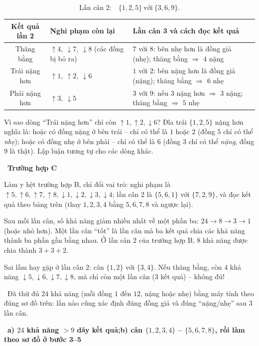 \documentclass[11pt]{article}
\providecommand{\AnsWord}{Đáp số}
\newcommand{\ans}[1]{\par\smallskip{\bfseries\color{tmGreen!88!black}\AnsWord:}\ {\bfseries\color{AnsRed}#1}\par}
\newcommand{\step}[2]{\par\smallskip\noindent{\bfseries\color{tmBlue!85!black}\StepWord~#1.}\ {\bfseries #2}\par\nopagebreak}
\newcommand{\verify}[1]{\par\smallskip\noindent{\bfseries\color{tmGreen!80!black}\faCheckCircle\ \CheckWord}\ #1\par}
\def\AnsWord{Đáp số}
\def\StepWord{Bước}
\def\CheckWord{Thử lại:}
\begin{document}
{\[ \text{Lần cân 2:}\quad \{1, 2, 5\} \ \text{với}\ \{3, 6, 9\}. \]
\begin{center}\footnotesize
\begin{tabular}{|c|p{3.6cm}|p{6.4cm}|}
\hline
\rowcolor{tmBlue!10} Kết quả lần 2 & Nghi phạm còn lại & Lần cân 3 và cách đọc kết quả\\ \hline
Thăng bằng & $\uparrow 4,\ \downarrow 7,\ \downarrow 8$ (các đồng bị bỏ ra) & $7$ với $8$: bên nhẹ hơn là đồng giả (nhẹ);
thăng bằng $\Rightarrow$ $4$ nặng\\ \hline
Trái nặng hơn & $\uparrow 1,\ \uparrow 2,\ \downarrow 6$ & $1$ với $2$: bên nặng hơn là đồng giả (nặng); thăng bằng
$\Rightarrow$ $6$ nhẹ\\ \hline
Phải nặng hơn & $\uparrow 3,\ \downarrow 5$ & $3$ với $9$: nếu $3$ nặng hơn $\Rightarrow$ $3$ nặng; thăng bằng
$\Rightarrow$ $5$ nhẹ\\ \hline
\end{tabular}
\end{center}
\begin{proofbox}Vì sao dòng ``Trái nặng hơn'' chỉ còn $\uparrow 1, \uparrow 2, \downarrow 6$? Đĩa trái $\{1, 2, 5\}$ nặng hơn nghĩa
là: hoặc có đồng nặng ở bên trái -- chỉ có thể là $1$ hoặc $2$ (đồng $5$ chỉ có thể \emph{nhẹ}); hoặc có đồng nhẹ ở bên phải --
chỉ có thể là $6$ (đồng $3$ chỉ có thể \emph{nặng}, đồng $9$ là thật). Lập luận tương tự cho các dòng khác.\end{proofbox}
\step{5}{Trường hợp C}
Làm y hệt trường hợp B, chỉ đổi vai trò: nghi phạm là $\uparrow 5, \uparrow 6, \uparrow 7, \uparrow 8, \downarrow 1, \downarrow 2,
\downarrow 3, \downarrow 4$; lần cân 2 là $\{5, 6, 1\}$ với $\{7, 2, 9\}$, và đọc kết quả theo bảng trên (thay $1, 2, 3, 4$ bằng
$5, 6, 7, 8$ và ngược lại).
\begin{tipbox}Sau mỗi lần cân, số khả năng giảm nhiều nhất về một phần ba: $24 \to 8 \to 3 \to 1$ (hoặc nhỏ hơn). Một lần cân
``tốt'' là lần cân mà ba kết quả chia các khả năng thành ba phần gần bằng nhau. Ở lần cân 2 của trường hợp B, $8$ khả năng được chia
thành $3 + 3 + 2$.\end{tipbox}
\begin{warnbox}Sai lầm hay gặp ở lần cân 2: cân $\{1, 2\}$ với $\{3, 4\}$. Nếu thăng bằng, còn $4$ khả năng
$\downarrow 5, \downarrow 6, \downarrow 7, \downarrow 8$, mà chỉ còn một lần cân ($3$ kết quả) -- không đủ!\end{warnbox}
\verify{Đã thử đủ $24$ khả năng (mỗi đồng $1$ đến $12$, nặng hoặc nhẹ) bằng máy tính theo đúng sơ đồ trên: lần nào cũng xác định
đúng đồng giả và đúng ``nặng/nhẹ'' sau $3$ lần cân.}
\ans{a) $24$ khả năng $> 9$ dãy kết quả;\quad b) cân $\{1,2,3,4\}$ -- $\{5,6,7,8\}$, rồi làm theo sơ đồ ở bước 3--5}
}
\end{document}
